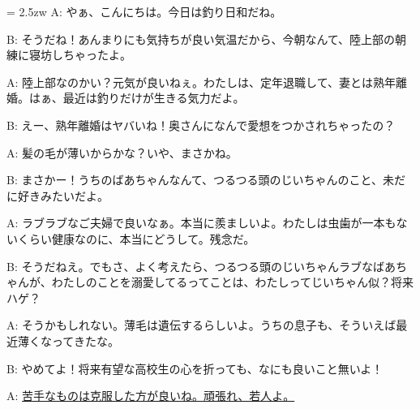 \documentclass[11pt]{amsart}
\title{}
\author{}
\newenvironment{hangall}[1]{\hangindent = 2.5zw\everypar{\hangindent = 2.5zw}}{}
\begin{document}
\maketitle
\begin{hangall}{}%
A: やぁ、こんにちは。今日は釣り日和だね。

B: そうだね！あんまりにも気持ちが良い気温だから、今朝なんて、陸上部の朝練に寝坊しちゃったよ。

A: 陸上部なのかい？元気が良いねぇ。わたしは、定年退職して、妻とは熟年離婚。はぁ、最近は釣りだけが生きる気力だよ。

B: えー、熟年離婚はヤバいね！奥さんになんで愛想をつかされちゃったの？

A: 髪の毛が薄いからかな？いや、まさかね。

B: まさかー！うちのばあちゃんなんて、つるつる頭のじいちゃんのこと、未だに好きみたいだよ。

A: ラブラブなご夫婦で良いなぁ。本当に羨ましいよ。わたしは虫歯が一本もないくらい健康なのに、本当にどうして。残念だ。

B: そうだねえ。でもさ、よく考えたら、つるつる頭のじいちゃんラブなばあちゃんが、わたしのことを溺愛してるってことは、わたしってじいちゃん似？将来ハゲ？

A: そうかもしれない。薄毛は遺伝するらしいよ。うちの息子も、そういえば最近薄くなってきたな。

B: やめてよ！将来有望な高校生の心を折っても、なにも良いこと無いよ！

A: \ul{苦手なものは克服した方が良いね。頑張れ、若人よ。}\end{hangall}
\end{document}
